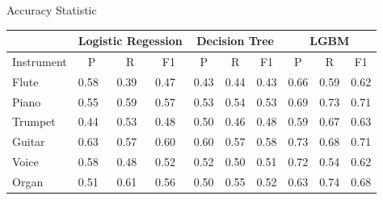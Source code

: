 \documentclass[11pt]{beamer}
\begin{document}
\begin{frame}{Accuracy Statistic}
	\begin{minipage}{8cm}
			\begin{center}\scriptsize
			\begin{table}[h!]
				\begin{tabular}{@{}l|lll|lll|lll@{}}
					\toprule
					& \multicolumn{3}{c}{\textbf{Logistic Regession}}                        & \multicolumn{3}{c}{\textbf{Decision Tree}}                             & \multicolumn{3}{c}{\textbf{LGBM}}                                      \\ \midrule
					Instrument & \multicolumn{1}{c}{P} & \multicolumn{1}{c}{R} & \multicolumn{1}{c}{F1} & \multicolumn{1}{c}{P} & \multicolumn{1}{c}{R} & \multicolumn{1}{c}{F1} & \multicolumn{1}{c}{P} & \multicolumn{1}{c}{R} & \multicolumn{1}{c}{F1}\\ 
					Flute      & 0.58                  & 0.39                  & 0.47                   & 0.43                  & 0.44                  & 0.43                   & 0.66                  & 0.59                  & 0.62                   \\
					Piano      & 0.55                  & 0.59                  & 0.57                   & 0.53                  & 0.54                  & 0.53                   & 0.69                  & 0.73                  & 0.71                   \\
					Trumpet    & 0.44                  & 0.53                  & 0.48                   & 0.50                  & 0.46                  & 0.48                   & 0.59                  & 0.67                  & 0.63                   \\
					Guitar     & 0.63                  & 0.57                  & 0.60                   & 0.60                  & 0.57                  & 0.58                   & 0.73                  & 0.68                  & 0.71                   \\
					Voice      & 0.58                  & 0.48                  & 0.52                   & 0.52                  & 0.50                  & 0.51                   & 0.72                  & 0.54                  & 0.62                   \\
					Organ      & 0.51                  & 0.61                  & 0.56                   & 0.50                  & 0.55                  & 0.52                   & 0.63                  & 0.74                  & 0.68                   \\ 
				\end{tabular}
				

\end{table}
\end{center}
\end{minipage}
\end{frame}
\end{document}
